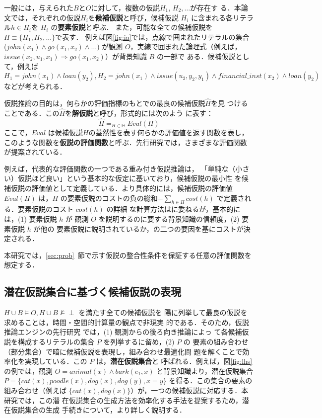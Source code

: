 \documentclass[japanese]{jnlp_1.4}
\newcommand{\argmax}{}
\begin{document}
一般には，与えられた$B$と$O$に対して，複数の仮説$H_1$, $H_2,\ldots$が存在す
る．本論文では，それぞれの仮説$H_i$を{\bf 候補仮説}と呼び，候補仮説
$H_i$ に含まれる各リテラル$h \in H_i$を $H_i$ の{\bf 要素仮説}と呼ぶ．
また，可能な全ての候補仮説を$H \equiv \{H_1,H_2,\ldots\}$で表す．
例えば図\ref{fig:ia}では，点線で囲まれたリテラルの集合 ($\mathit{john}(x_1)
\land \mathit{go}(x_1,x_2) \land \ldots$) が観測 $O$，実線で囲まれた論理式（例えば，
$\mathit{issue}(x_2,u_1,x_1) \Rightarrow go(x_1, x_2)$）が背景知識 $B$ の一部で
ある．候補仮説として，例えば $H_1 = \mathit{john}(x_1) \land \mathit{loan}(y_2), H_2 =
\mathit{john}(x_1) \land \mathit{issue}(u_2,y_2,y_1) \land \mathit{financial\_inst}(x_2)
\land \mathit{loan}(y_2)$ などが考えられる．

仮説推論の目的は，何らかの評価指標のもとでの最良の候補仮説$\hat{H}$を見
つけることである．この$\hat{H}$を{\bf 解仮説}と呼び，形式的には次のよう
に表す：
\begin{equation}
\hat{H} = \argmax_{H \in \mathbb{H}} \mathit{Eval}(H)
\end{equation}
ここで，$\mathit{Eval}$ は候補仮説$H$の蓋然性を表す何らかの評価値を返す関数を表し，
このような関数を{\bf 仮説の評価関数}と呼ぶ．先行研究では，さまざまな評価関数
が提案されている\cite{Hobbs93,Singla11,Inoue12b,Raghavan10}．

例えば，代表的な評価関数の一つである重み付き仮説推論\cite{Hobbs93}は，
「単純な（小さい）仮説ほど良い」という基本的な仮定に基いており，候補仮説の最小性
を候補仮説の評価値として定義している．より具体的には，候補仮説の評価値
$\mathit{Eval}(H)$ は，$H$ の要素仮説のコストの負の総和$-\sum_{h \in H}
\mathit{cost}(h)$ で定義される．要素仮説のコスト $\mathit{cost}(h)$ の詳細
な計算方法は\cite{Hobbs93}に委ねるが，基本的には，(1) 要素仮説 $h$ が
観測 $O$ を説明するのに要する背景知識の信頼度，(2) 要素仮説 $h$ が他の
要素仮説に説明されているか，の二つの要因を基にコストが決定される．

本研究では，\ref{sec:prob}~節で示す仮説の整合性条件を保証する任意の評価関数を想定する．



\subsection{潜在仮説集合に基づく候補仮説の表現}
\label{sec:potential}

$H \cup B \models O, H \cup B \nvDash \perp$ を満たす全ての候補仮説を
陽に列挙して最良の仮説を求めることは，時間・空間的計算量の観点で非現実
的である．そのため，仮説推論エンジンの先行研究
\cite{Inoue11,Inoue12,Yamamoto15}では，(1) 観測からの後ろ向き推論によっ
て各候補仮説を構成するリテラルの集合 $P$ を列挙するに留め，(2) $P$ の
要素の組み合わせ（部分集合）で暗に候補仮説を表現し，組み合わせ最適化問
題を解くことで効率化を実現している．この $P$ は，\textbf{潜在仮説集合}と
呼ばれる．例えば，図\ref{fig:lhs}の例では，観測 $O=\mathit{animal}(x) \land
\mathit{bark}(e_1,x)$ と背景知識より，潜在仮説集合 $P=\{\mathit{cat}(x), \mathit{poodle}(x),
\mathit{dog}(x), \mathit{dog}(y), x=y\}$ を得る．この集合の要素の組み合わせ（例えば
$\{\mathit{cat}(x), \mathit{dog}(x)\}$）が，一つの候補仮説に対応する．本研究では，この潜
在仮説集合の生成方法を効率化する手法を提案するため，潜在仮説集合の生成
手続きについて，より詳しく説明する．
\end{document}
